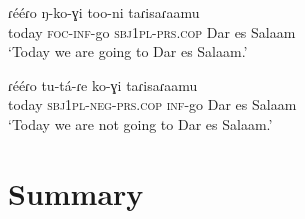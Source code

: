 \documentclass[output=paper,colorlinks,citecolor=brown,draftmode]{langscibook}
\begin{document}
\ea\label{ex:ngo:93} 
    \gll ɾééɾo ŋ-ko-ɣi too-ni taɾisaɾaamu\\ 
        today \textsc{foc}{}-\textsc{inf}{}-go \textsc{sbj}1\textsc{pl}{}-\textsc{prs.cop} {Dar es Salaam}\\
     \glt ‘Today we are going to Dar es Salaam.’ \citep[278]{Gibson2019} 
\z 

\ea\label{ex:ngo:94} 
    \gll ɾééɾo tu-tá-ɾe ko-ɣi taɾisaɾaamu\\ 
        today \textsc{sbj}1\textsc{pl}{}-\textsc{neg{}-prs.cop} \textsc{inf}{}-go {Dar es Salaam}\\
 \glt ‘Today we are not going to Dar es Salaam.’
\z 

\section{Summary}\label{sec:ngo:5}
\end{document}
